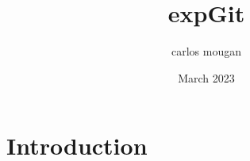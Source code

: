 \documentclass{article}
\title{expGit}
\author{carlos mougan }
\date{March 2023}
\begin{document}
\section{Introduction}
\end{document}
